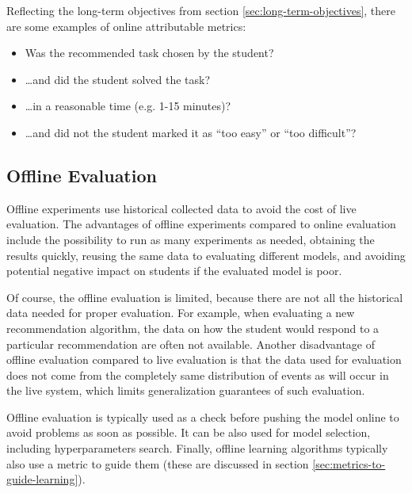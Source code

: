 Reflecting the long-term objectives from section \ref{sec:long-term-objectives},
  there are some examples of online attributable metrics:
\begin{itemize}
  \item Was the recommended task chosen by the student?
  \item \ldots and did the student solved the task?
  \item \ldots in a reasonable time (e.g. 1-15 minutes)?
  \item \ldots and did not the student marked it as ``too easy'' or ``too difficult''?
\end{itemize}





\subsection{Offline Evaluation}

Offline experiments use historical collected data
  to avoid the cost of live evaluation.
The advantages of offline experiments compared to online evaluation include
  the possibility to run as many experiments as needed,
  obtaining the results quickly,
  reusing the same data to evaluating different models,
  and avoiding potential negative impact on students if the evaluated model is poor.

Of course, the offline evaluation is limited,
  because there are not all the historical data needed
  for proper evaluation.
For example, when evaluating a new recommendation algorithm,
  the data on how the student would respond to a particular recommendation
  are often not available.
Another disadvantage of offline evaluation compared to live evaluation
  is that the data used for evaluation does not come from the completely
  same distribution of events as will occur in the live system,
  which limits generalization guarantees of such evaluation.

Offline evaluation is typically used as a check before pushing
  the model online to avoid problems as soon as possible.
It can be also used for model selection,
  including hyperparameters search.
Finally, offline learning algorithms typically also use
  a metric to guide them
  (these are discussed in section \ref{sec:metrics-to-guide-learning}).


